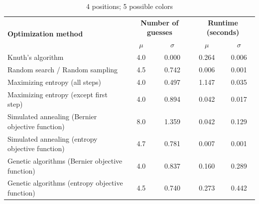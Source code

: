 \documentclass[11pt]{article}
\begin{document}
\begin{table}[h!]
\begin{center}
\begin{tabular}{l c c c c}
\toprule
\multirow{2}{*}{\bfseries Optimization method} 		& \multicolumn{2}{c}{\bfseries Number of guesses} 		& \multicolumn{2}{c}{\bfseries Runtime (seconds)}	\\
\cmidrule(lr){2-3}  \cmidrule(lr){4-5}				& $\mu$ & $\sigma$								& $\mu$ & $\sigma$							\\
\cmidrule(lr){1-5}
Knuth's algorithm							& 4.0 & 0.000									& 0.264 & 0.006							\\
Random search / Random sampling				& 4.5 & 0.742									& 0.006 & 0.001							\\
Maximizing entropy (all steps)					& 4.0 & 0.497									& 1.147 & 0.035							\\
Maximizing entropy (except first step)			& 4.0 & 0.894									& 0.042 &	0.017							\\
Simulated annealing (Bernier objective function)	& 8.0 & 1.359									& 0.042 & 0.129							\\
Simulated annealing (entropy objective function)	& 4.7 & 0.781									& 0.007 & 0.001							\\
Genetic algorithms (Bernier objective function)		& 4.0 & 0.837									& 0.160 & 0.289							\\
Genetic algorithms (entropy objective function)		& 4.5 & 0.740									& 0.273 & 0.442							\\
\bottomrule
\end{tabular}
\end{center}
\caption{4 positions; 5 possible colors}
\label{fig:compare_4_5}
\end{table}

\newpage
\end{document}
